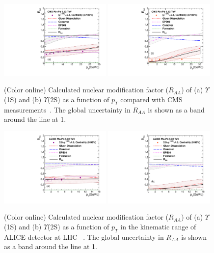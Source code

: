 {  

\begin{figure}
\includegraphics[width=0.49\textwidth]{Figures/Fig18l_Y1S_CMS_RAAPt_Shade.pdf}
\includegraphics[width=0.49\textwidth]{Figures/Fig18r_Y2S_CMS_RAAPt_Shade.pdf}
\caption{(Color online) Calculated nuclear modification factor ($R_{AA}$) \cite{Kumar:2019xdj}
  of (a) $\Upsilon$(1S) and 
  (b) $\Upsilon$(2S) as a function of $p_{T}$ 
  compared with CMS measurements~\cite{Sirunyan:2018nsz}.
The global uncertainty in $R_{AA}$ is shown as a band around the line at 1.
}
\label{fig:UpsilonRaaPtCMS}
\end{figure}



\begin{figure}
\includegraphics[width=0.49\textwidth]{Figures/Fig19l_ALICE_Y1SRAAPt_Shade.pdf}
\includegraphics[width=0.49\textwidth]{Figures/Fig19r_ALICE_Y2SRAAPt_Shade.pdf}
\caption{(Color online) Calculated nuclear modification factor ($R_{AA}$) \cite{Kumar:2019xdj}
  of (a) $\Upsilon$(1S) and 
  (b) $\Upsilon$(2S) as a function of $p_{T}$ in the kinematic range of ALICE detector
at LHC ~\cite{ALICE:2020wwx}. The global uncertainty in $R_{AA}$ is shown as a band
around the line at 1.
} 
\label{fig:UpsilonRaaPtALICE}
\end{figure}

}
